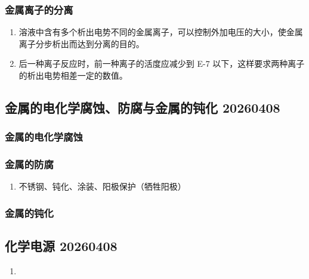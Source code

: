 \subsubsection{金属离子的分离}

\begin{enumerate}
    \item 溶液中含有多个析出电势不同的金属离子，可以控制外加电压的大小，使金属离子分步析出而达到分离的目的。
    \item 后一种离子反应时，前一种离子的活度应减少到 \num{E-7} 以下，这样要求两种离子的析出电势相差一定的数值。

\end{enumerate}

\subsection{金属的电化学腐蚀、防腐与金属的钝化 20260408}

\subsubsection{金属的电化学腐蚀}

\subsubsection{金属的防腐}

\begin{enumerate}
    \item 不锈钢、钝化、涂装、阳极保护（牺牲阳极）
\end{enumerate}
\subsubsection{金属的钝化}

\subsection{化学电源 20260408}

\begin{enumerate}
    \item
\end{enumerate}

